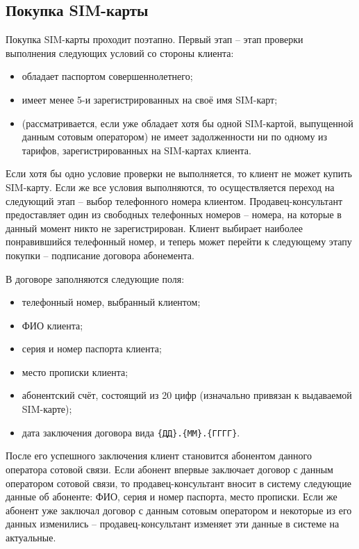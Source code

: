 \subsection{Покупка SIM-карты}


Покупка SIM-карты проходит поэтапно. Первый этап -- этап проверки выполнения следующих условий со стороны клиента:
\begin{itemize}
    \item обладает паспортом совершеннолетнего;
    \item имеет менее 5-и зарегистрированных на своё имя SIM-карт;
    \item (рассматривается, если уже обладает хотя бы одной SIM-картой, выпущенной данным сотовым оператором) не имеет задолженности ни по одному из тарифов, зарегистрированных на SIM-картах клиента.
\end{itemize}

Если хотя бы одно условие проверки не выполняется, то клиент не может купить SIM-карту. Если же все условия выполняются, то осуществляется переход на следующий этап -- выбор телефонного номера клиентом. Продавец-консультант предоставляет один из свободных телефонных номеров -- номера, на которые в данный момент никто не зарегистрирован. Клиент выбирает наиболее понравившийся телефонный номер, и теперь может перейти к следующему этапу покупки -- подписание договора абонемента.

В договоре заполняются следующие поля:
\begin{itemize}
    \item телефонный номер, выбранный клиентом;
    \item ФИО клиента;
    \item серия и номер паспорта клиента;
    \item место прописки клиента;
    \item абонентский счёт, состоящий из 20 цифр (изначально привязан к выдаваемой SIM-карте);
    \item дата заключения договора вида \texttt{\{ДД\}.\{ММ\}.\{ГГГГ\}}.
\end{itemize}

После его успешного заключения клиент становится абонентом данного оператора сотовой связи. Если абонент впервые заключает договор с данным оператором сотовой связи, то продавец-консультант вносит в систему следующие данные об абоненте: ФИО, серия и номер паспорта, место прописки. Если же абонент уже заключал договор с данным сотовым оператором и некоторые из его данных изменились -- продавец-консультант изменяет эти данные в системе на актуальные.

